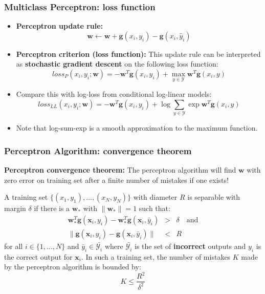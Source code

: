 \documentclass[ignorenonframetext,plain,fleqn]{beamer}
\newcommand{\loss}{\mathit{loss}}
\renewcommand{\vec}{\mathbf}
\begin{document}
\begin{frame}\frametitle{Multiclass Perceptron: loss function}
\begin{itemize}
\item {\bf Perceptron update rule:}
\[ \vec{w} \leftarrow \vec{w} 
+\vec{g}(x_i,y_i)
-\vec{g}(x_i,\hat{y}_i)
\]
\item {\bf Perceptron criterion (loss function):} This update rule can
  be interpreted as {\bf stochastic gradient descent}
  on the following loss function:
\[
\loss_P(x_i, y_i; \vec{w}) = 
-\vec{w}^T \vec{g}(x_i,y_i)
+\max_{y\in\mathcal{Y}} \vec{w}^T \vec{g}(x_i,y)
\]

\item Compare this with log-loss from conditional log-linear models: \[
\loss_{LL}(x_i, y_i; \vec{w}) = 
-\vec{w}^T \vec{g}(x_i,y_i) 
+\log \sum_{y\in\mathcal{Y}} \exp \vec{w}^T \vec{g}(x_i,y) 
\]

\item Note that log-sum-exp is a smooth approximation to the maximum
  function.
\end{itemize}
\end{frame}

\begin{frame}\frametitle{Perceptron Algorithm: convergence theorem}
{\bf Perceptron convergence theorem:} The perceptron algorithm will
find $\vec{w}$ with zero error on training set after a finite number
of mistakes if one exists!
\vspace{5mm}

A training set $\{(x_1,y_1),\dots,(x_N,y_N)\}$ with diameter $R$ is
separable with margin $\delta$ if there is a $\vec{w}_*$ with
$\|\vec{w}_*\|=1$ such that: \begin{eqnarray*}
  \vec{w}_*^T\vec{g}(\vec{x}_i,y_i) - \vec{w}_*^T\vec{g}(\vec{x}_i,\bar{y}_i)
  &>& \delta \quad\text{and}\\ \|\vec{g}(\vec{x}_i, y_i) -
  \vec{g}(\vec{x}_i, \bar{y}_i)\| &<& R
\end{eqnarray*}
for all $i \in \{1,\dots,N\}$ and $\bar{y}_i \in \bar{\mathcal{Y}_i}$ where
$\bar{\mathcal{Y}_i}$ is the set of {\bf incorrect} outputs and $y_i$
is the correct output for $\vec{x}_i$.  In such a training set, the
number of mistakes $K$ made by the perceptron algorithm is bounded
by: \[ K \leq \frac{R^2}{\delta^2}
\]
\end{frame}
\end{document}
